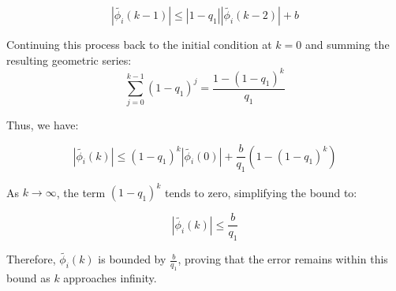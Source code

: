 \documentclass[journal,onecolumn]{IEEEtran}
\begin{document}
\begin{equation}
\label{model 28}
|\tilde{\phi_i}(k-1)| \leq |1 - q_1| |\tilde{\phi_i}(k-2)| + b
\end{equation}

Continuing this process back to the initial condition at \(k=0\) and summing the resulting geometric series:
\[
\sum_{j=0}^{k-1} (1-q_1)^j = \frac{1-(1-q_1)^k}{q_1}
\]

Thus, we have:

\begin{equation}
\label{model 29}
|\tilde{\phi_i}(k)| \leq (1 - q_1)^k |\tilde{\phi_i}(0)| + \frac{b}{q_1} (1 - (1 - q_1)^k)
\end{equation}

As \(k \rightarrow \infty\), the term \((1-q_1)^k\) tends to zero, simplifying the bound to:

\begin{equation}
\label{model 30}
|\tilde{\phi_i}(k)| \leq \frac{b}{q_1}
\end{equation}

Therefore, \(\tilde{\phi_i}(k)\) is bounded by \(\frac{b}{q_1}\), proving that the error remains within this bound as \(k\) approaches infinity.



\end{document}
